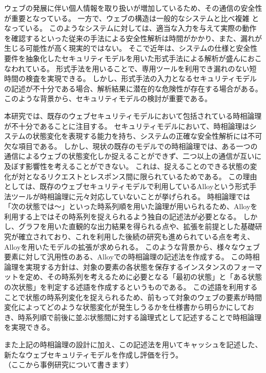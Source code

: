 \documentclass[12pt,a4paper]{jbook}
\begin{document}
ウェブの発展に伴い個人情報を取り扱いが増加しているため、その通信の安全性が重要となっている。
一方で、ウェブの構造は一般的なシステムと比べ複雑
\color{red}
となっている。
このようなシステムに対しては、適当な入力を与えて実際の動作を確認するといった従来の手法による安全性解析は時間がかかり、また、漏れが生じる可能性が高く現実的ではない。
そこで近年は、システムの仕様と安全性要件を抽象化したセキュリティモデルを用いた形式手法による解析が盛んにおこなわれている。
形式手法を用いることで、専用ツールを利用でき漏れのない短時間の検査を実現できる。
\color{black}
しかし、形式手法の入力となるセキュリティモデルの記述が不十分である場合、解析結果に潜在的な危険性が存在する場合がある。
このような背景から、セキュリティモデルの検討が重要である。

本研究では、既存のウェブセキュリティモデルにおいて包括されている時相論理が不十分であることに注目する。
セキュリティモデルにおいて、時相論理はシステムの状態変化を表現する能力を持ち、システムの正確な安全性解析には不可欠な項目である。
しかし、現状の既存のモデルでの時相論理では、ある一つの通信によるウェブの状態変化しか捉えることができず、二つ以上の通信が互いに及ぼす影響性を考えることができない。
これは、捉えることのできる状態の変化が対となるリクエストとレスポンス間に限られているためである。
\color{red}
この理由としては、既存のウェブセキュリティモデルで利用しているAlloyという形式手法ツールが時相論理に元々対応していないことが挙げられる。
時相論理では「次の状態では～」といった時系列順を用いた論理が用いられるため、Alloyを利用する上ではその時系列を捉えられるよう独自の記述法が必要となる。
しかし、グラフを用いた直観的な出力結果を得られる点や、拡張を前提とした基礎研究が確立されており、これを利用した後続の研究も進められている点を考え、Alloyを用いたモデルの拡張が求められる。
このような背景から、様々なウェブ要素に対して汎用性のある、Alloyでの時相論理の記述法を作成する。
この時相論理を実現する方針は、対象の要素の各状態を保存するインスタンスのフォーマットを定め、その時系列を考えるために必要となる「最初の状態」と「ある状態の次状態」を判定する述語を作成するというものである。
この述語を利用することで状態の時系列変化を捉えられるため、前もって対象のウェブの要素が時間変化によってどのような状態変化が発生しうるかを仕様書から明らかにしておき、時系列順で前後に並ぶ状態間に対する論理式として記述することで時相論理を実現できる。
\color{black}

また上記の時相論理の設計に加え、この記述法を用いてキャッシュを記述した、新たなウェブセキュリティモデルを作成し評価を行う。
\\（ここから事例研究について書きます）
\end{document}
